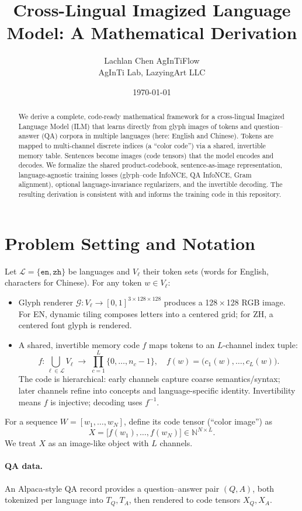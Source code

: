 \documentclass[11pt]{article}
\title{Cross-Lingual Imagized Language Model: A Mathematical Derivation}
\author{\begin{tabular}{c}Lachlan Chen \quad AgInTiFlow\\AgInTi Lab, LazyingArt LLC\end{tabular}}
\date{\today}
\begin{document}
\maketitle

\begin{abstract}
We derive a complete, code-ready mathematical framework for a cross-lingual Imagized Language Model (ILM) that learns directly from glyph images of tokens and question--answer (QA) corpora in multiple languages (here: English and Chinese). Tokens are mapped to multi-channel discrete indices (a ``color code'') via a shared, invertible memory table. Sentences become images (code tensors) that the model encodes and decodes. We formalize the shared product-codebook, sentence-as-image representation, language-agnostic training losses (glyph--code InfoNCE, QA InfoNCE, Gram alignment), optional language-invariance regularizers, and the invertible decoding. The resulting derivation is consistent with and informs the training code in this repository.
\end{abstract}

\section{Problem Setting and Notation}
Let \(\mathcal{L}=\{\texttt{en},\texttt{zh}\}\) be languages and \(V_\ell\) their token sets (words for English, characters for Chinese). For any token \(w\in V_{\ell}\):
\begin{itemize}
  \item Glyph renderer \(\mathcal{G}: V_\ell \to [0,1]^{3\times 128\times 128}\) produces a 128\,\(\times\)\,128 RGB image. For EN, dynamic tiling composes letters into a centered grid; for ZH, a centered font glyph is rendered.
  \item A shared, invertible memory code \(f\) maps tokens to an \(L\)-channel index tuple:
  \[
    f: \bigcup_{\ell\in\mathcal{L}} V_\ell\;\to\; \prod_{c=1}^L \{0,\ldots,n_c-1\}, \quad f(w)=\big(c_1(w),\ldots,c_L(w)\big).
  \]
  The code is hierarchical: early channels capture coarse semantics/syntax; later channels refine into concepts and language-specific identity. Invertibility means \(f\) is injective; decoding uses \(f^{-1}\).
\end{itemize}
For a sequence \(W=[w_1,\ldots,w_N]\), define its code tensor (``color image'') as
\[
  X=\big[ f(w_1),\ldots,f(w_N)\big] \in \mathbb{N}^{N\times L}.
\]
We treat \(X\) as an image-like object with \(L\) channels.

\paragraph{QA data.} An Alpaca-style QA record provides a question--answer pair \((Q,A)\), both tokenized per language into \(T_Q, T_A\), then rendered to code tensors \(X_Q, X_A\).
\end{document}
